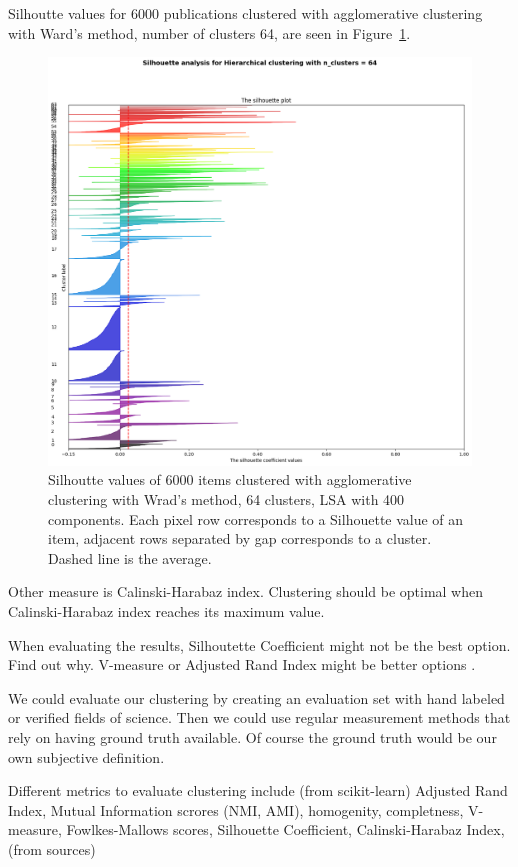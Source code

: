 Silhoutte values for 6000 publications clustered with 
agglomerative clustering with Ward's method, number of clusters 
64, are seen in Figure~\ref{fig:silh01}.
\begin{figure}[ht]
  \begin{center}    
\includegraphics[width=13cm]{images/6000-64-400-Hierarchical-silhouette-plot.png}
    \caption{Silhoutte values of 6000 items clustered with 
    agglomerative clustering with Wrad's method, 64 clusters, 
    LSA with 400 components. Each pixel row corresponds to a 
    Silhouette value of an item, adjacent rows separated by gap 
    corresponds to a cluster.
    Dashed line is the average.}
    \label{fig:silh01}
  \end{center}
\end{figure}

Other measure is Calinski-Harabaz index. Clustering should be 
optimal when Calinski-Harabaz index reaches its maximum value. 
\cite{}

When evaluating the results, Silhoutette Coefficient might not be
the best option. Find out why. V-measure or Adjusted Rand Index
might be better options \cite{noauthor_clustering_nodate}.

We could evaluate our clustering by creating an evaluation set with
hand labeled or verified fields of science. Then we could use
regular measurement methods that rely on having ground truth 
available. Of course the ground truth would be our own subjective 
definition. 

Different metrics to evaluate clustering include (from 
scikit-learn) Adjusted Rand Index, Mutual Information scrores 
(NMI, AMI), homogenity, completness, V-measure, Fowlkes-Mallows 
scores, Silhouette Coefficient, Calinski-Harabaz Index, (from 
sources) 

